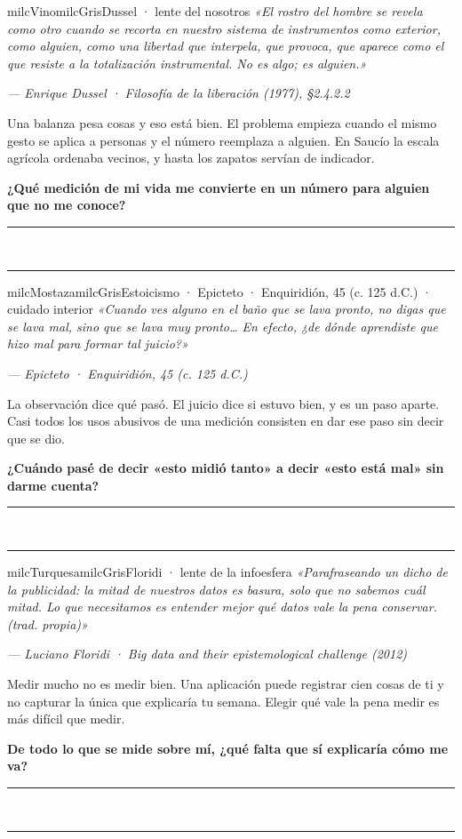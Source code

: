 \documentclass[11pt,letterpaper]{article}
\newcommand{\linead}[1]{\noindent\color{milcLinea}\rule{#1}{0.5pt}\color{milcNegro}}
\begin{document}
\begin{softbox}{milcVino}{milcGris}{Dussel · lente del nosotros}
\textit{«El rostro del hombre se revela como otro cuando se recorta en nuestro sistema de instrumentos como exterior, como alguien, como una libertad que interpela, que provoca, que aparece como el que resiste a la totalización instrumental. No es algo; es alguien.»}

{\footnotesize\itshape\color{milcNegro!70}--- Enrique Dussel · Filosofía de la liberación (1977), §2.4.2.2}

Una balanza pesa cosas y eso está bien. El problema empieza cuando el mismo gesto se aplica a personas y el número reemplaza a alguien. En Saucío la escala agrícola ordenaba vecinos, y hasta los zapatos servían de indicador.

\textbf{¿Qué medición de mi vida me convierte en un número para alguien que no me conoce?}
\end{softbox}
\linead{\linewidth}\\[1mm]
\linead{\linewidth}

\begin{softbox}{milcMostaza}{milcGris}{Estoicismo · Epicteto · Enquiridión, 45 (c. 125 d.C.) · cuidado interior}
\textit{«Cuando ves alguno en el baño que se lava pronto, no digas que se lava mal, sino que se lava muy pronto… En efecto, ¿de dónde aprendiste que hizo mal para formar tal juicio?»}

{\footnotesize\itshape\color{milcNegro!70}--- Epicteto · Enquiridión, 45 (c. 125 d.C.)}

La observación dice qué pasó. El juicio dice si estuvo bien, y es un paso aparte. Casi todos los usos abusivos de una medición consisten en dar ese paso sin decir que se dio.

\textbf{¿Cuándo pasé de decir «esto midió tanto» a decir «esto está mal» sin darme cuenta?}
\end{softbox}
\linead{\linewidth}\\[1mm]
\linead{\linewidth}

\begin{softbox}{milcTurquesa}{milcGris}{Floridi · lente de la infoesfera}
\textit{«Parafraseando un dicho de la publicidad: la mitad de nuestros datos es basura, solo que no sabemos cuál mitad. Lo que necesitamos es entender mejor qué datos vale la pena conservar. (trad. propia)»}

{\footnotesize\itshape\color{milcNegro!70}--- Luciano Floridi · Big data and their epistemological challenge (2012)}

Medir mucho no es medir bien. Una aplicación puede registrar cien cosas de ti y no capturar la única que explicaría tu semana. Elegir qué vale la pena medir es más difícil que medir.

\textbf{De todo lo que se mide sobre mí, ¿qué falta que sí explicaría cómo me va?}
\end{softbox}
\linead{\linewidth}\\[1mm]
\linead{\linewidth}
\end{document}
